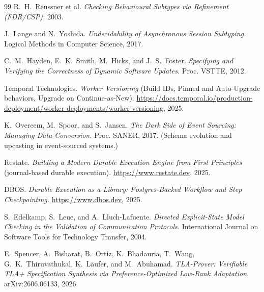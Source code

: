 \documentclass[11pt]{article}
\begin{document}
\begin{thebibliography}{99}
 R.\ H.\ Reussner et al. \emph{Checking Behavioural Subtypes
via Refinement (FDR/CSP).} 2003.

 J.\ Lange and N.\ Yoshida. \emph{Undecidability of
Asynchronous Session Subtyping.} Logical Methods in Computer Science, 2017.

 C.\ M.\ Hayden, E.\ K.\ Smith, M.\ Hicks, and J.\ S.\ Foster.
\emph{Specifying and Verifying the Correctness of Dynamic Software Updates.}
Proc. VSTTE, 2012.

 Temporal Technologies. \emph{Worker Versioning} (Build IDs,
Pinned and Auto-Upgrade behaviors, Upgrade on Continue-as-New).
\url{https://docs.temporal.io/production-deployment/worker-deployments/worker-versioning},
2025.

 K.\ Overeem, M.\ Spoor, and S.\ Jansen. \emph{The Dark Side
of Event Sourcing: Managing Data Conversion.} Proc. SANER, 2017. (Schema
evolution and upcasting in event-sourced systems.)

 Restate. \emph{Building a Modern Durable Execution Engine from
First Principles} (journal-based durable execution).
\url{https://www.restate.dev}, 2025.

 DBOS. \emph{Durable Execution as a Library: Postgres-Backed
Workflow and Step Checkpointing.} \url{https://www.dbos.dev}, 2025.

 S.\ Edelkamp, S.\ Leue, and A.\ Lluch-Lafuente. \emph{Directed
Explicit-State Model Checking in the Validation of Communication Protocols.}
International Journal on Software Tools for Technology Transfer, 2004.

 E.\ Spencer, A.\ Bisharat, B.\ Ortiz, K.\ Bhadauria, T.\
Wang, G.\ K.\ Thiruvathukal, K.\ L\"aufer, and M.\ Abuhamad. \emph{TLA-Prover:
Verifiable TLA+ Specification Synthesis via Preference-Optimized Low-Rank
Adaptation.} arXiv:2606.06133, 2026.

\end{thebibliography}
\end{document}
